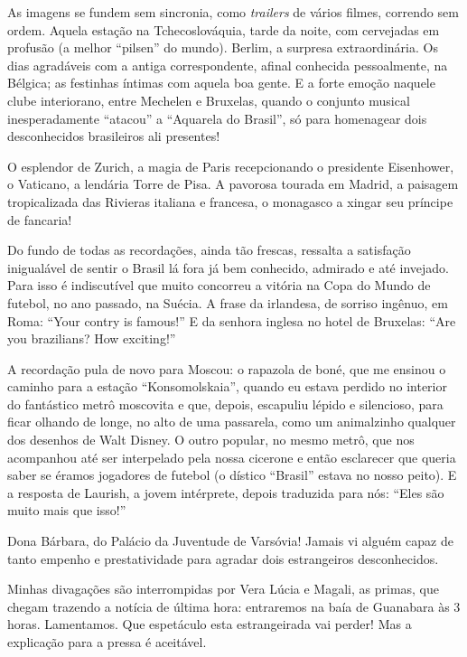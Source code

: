 As imagens se fundem sem sincronia, como \textit{trailers} de vários filmes, correndo sem ordem. Aquela estação na Tchecoslováquia, tarde da noite, com cervejadas em profusão (a melhor ``pilsen'' do mundo). Berlim, a surpresa extraordinária. Os dias agradáveis com a antiga correspondente, afinal conhecida pessoalmente, na Bélgica; as festinhas íntimas com aquela boa gente. E a forte emoção naquele clube interiorano, entre Mechelen e Bruxelas, quando o conjunto musical inesperadamente ``atacou'' a ``Aquarela do Brasil'', só para homenagear dois desconhecidos brasileiros ali presentes!

O esplendor de Zurich, a magia de Paris recepcionando o presidente Eisenhower, o Vaticano, a lendária Torre de Pisa. A pavorosa tourada em Madrid, a paisagem tropicalizada das Rivieras italiana e francesa, o monagasco a xingar seu príncipe de fancaria!

Do fundo de todas as recordações, ainda tão frescas, ressalta a satisfação inigualável de sentir o Brasil lá fora já bem conhecido, admirado e até invejado. Para isso é indiscutível que muito concorreu a vitória na Copa do Mundo de futebol, no ano passado, na Suécia. A frase da irlandesa, de sorriso ingênuo, em Roma: ``Your contry is famous!'' E da senhora inglesa no hotel de Bruxelas: ``Are you brazilians? How exciting!''

A recordação pula de novo para Moscou: o rapazola de boné, que me ensinou o caminho para a estação ``Konsomolskaia'', quando eu estava perdido no interior do fantástico metrô moscovita e que, depois, escapuliu lépido e silencioso, para ficar olhando de longe, no alto de uma passarela, como um animalzinho qualquer dos desenhos de Walt Disney. O outro popular, no mesmo metrô, que nos acompanhou até ser interpelado pela nossa cicerone e então esclarecer que queria saber se éramos jogadores de futebol (o dístico ``Brasil'' estava no nosso peito). E a resposta de Laurish, a jovem intérprete, depois traduzida para nós: ``Eles são muito mais que isso!''

Dona Bárbara, do Palácio da Juventude de Varsóvia! Jamais vi alguém capaz de tanto empenho e prestatividade para agradar dois estrangeiros desconhecidos.

Minhas divagações são interrompidas por Vera Lúcia e Magali, as primas, que chegam trazendo a notícia de última hora: entraremos na baía de Guanabara às 3 horas. Lamentamos. Que espetáculo esta estrangeirada vai perder! Mas a explicação para a pressa é aceitável.

